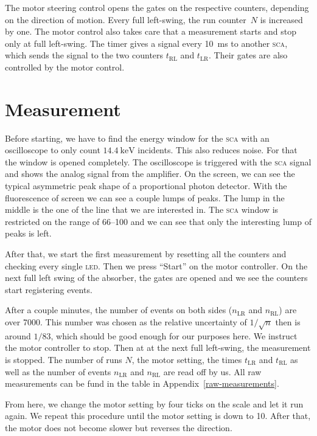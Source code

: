 \documentclass[11pt, english, fleqn, DIV=15, headinclude, BCOR=2cm]{scrreprt}
\newcommand\tRL{t_\text{RL}}
\newcommand\tLR{t_\text{LR}}
\newcommand\nRL{n_\text{RL}}
\newcommand\nLR{n_\text{LR}}
\begin{document}
The motor steering control opens the gates on the respective counters,
depending on the direction of motion. Every full left-swing, the run
counter~$N$ is increased by one. The motor control also takes care that a
measurement starts and stop only at full left-swing. The timer gives a signal
every \SI{10}{\milli\second} to another \textsc{sca}, which sends the signal to
the two counters $t_\text{RL}$ and $t_\text{LR}$. Their gates are also
controlled by the motor control.

\section{Measurement}

Before starting, we have to find the energy window for the \textsc{sca} with an
oscilloscope to only count $\SI{14.4}{\kilo\electronvolt}$ incidents. This also
reduces noise. For that the window is opened completely. The oscilloscope is
triggered with the \textsc{sca} signal and shows the analog signal from the
amplifier. On the screen, we can see the typical asymmetric peak shape of a
proportional photon detector. With the fluorescence of screen we can see a
couple lumps of peaks. The lump in the middle is the one of the line that we
are interested in. The \textsc{sca} window is restricted on the range of
\numrange{66}{100} and we can see that only the interesting lump of peaks is
left.

After that, we start the first measurement by resetting all the counters and
checking every single \textsc{led}. Then we press \enquote{Start} on the motor
controller. On the next full left swing of the absorber, the gates are opened
and we see the counters start registering events.

After a couple minutes, the number of events on both sides ($\nLR$ and $\nRL$)
are over \num{7000}. This number was chosen as the relative uncertainty of
$1/\sqrt{n}$ then is around $1/83$, which should be good enough for our
purposes here. We instruct the motor controller to stop. Then at at the next
full left-swing, the measurement is stopped. The number of runs $N$, the motor
setting, the times $\tLR$ and $\tRL$ as well as the number of events $\nLR$ and
$\nRL$ are read off by us. All raw measurements can be fund in the table in
Appendix~\ref{raw-measurements}.

From here, we change the motor setting by four ticks on the scale and let it run
again. We repeat this procedure until the motor setting is down to 10. After
that, the motor does not become slower but reverses the direction.
\end{document}
